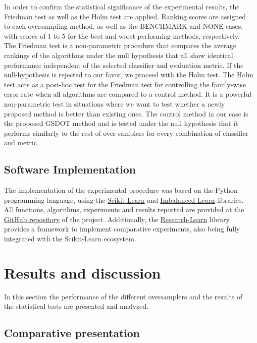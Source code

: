 In order to confirm the statistical significance of the experimental results, the Friedman test as well as the Holm test \cite{JanezDemsar.2006} are applied. Ranking scores are assigned to each oversampling method, as well as the BENCHMARK and NONE cases, with scores of 1 to 5 for the best and worst performing methods, respectively. The Friedman test is a non-parametric procedure that compares the average rankings of the algorithms under the null hypothesis that all show identical performance independent of the selected classifier and evaluation metric. If the null-hypothesis is rejected to our favor, we proceed with the Holm test. The Holm test acts as a post-hoc test for the Friedman test for controlling the family-wise error rate when all algorithms are compared to a control method. It is a powerful non-parametric test in situations where we want to test whether a newly proposed method is better than existing ones. The control method in our case is the proposed GSDOT method and is tested under the null hypothesis that it performs similarly to the rest of over-samplers for every combination of classifier and metric.

\subsection{Software Implementation}

The implementation of the experimental procedure was based on the Python
programming language, using the \href{https://scikit-learn.org/stable/}{Scikit-Learn} \cite{Pedregosa.2011} and \href{https://imbalanced-learn.org/en/stable/}{Imbalanced-Learn} \cite{Lemaitre.2017} libraries. All functions, algorithms, experiments and results reported are provided at the \href{https://github.com/AlgoWit/publications/tree/master/small-data-oversampling}{GitHub repository} of the project. Additionally, the \href{https://research-learn.readthedocs.io/en/latest/?badge=latest}{Research-Learn} library provides a framework to implement comparative experiments, also being fully integrated with the Scikit-Learn ecosystem.

\section{Results and discussion}
\label{results}

In this section the performance of the different oversamplers and the results 
of the statistical tests are presented and analyzed.

\subsection{Comparative presentation}

